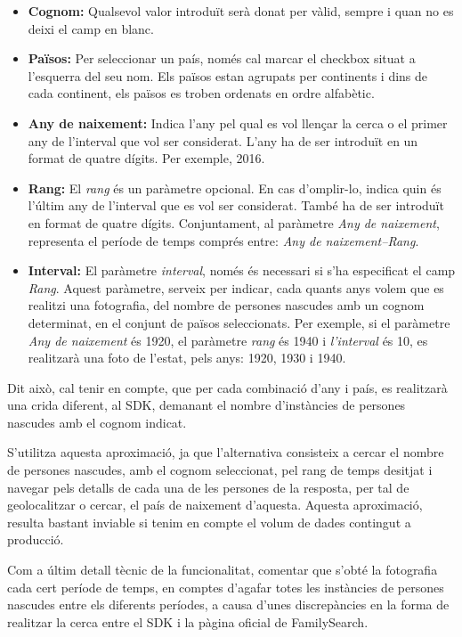     \begin{itemize}
        \item \textbf{Cognom:} Qualsevol valor introduït serà donat per vàlid, sempre i quan no es deixi el camp en blanc.
        \item \textbf{Països:} Per seleccionar un país, només cal marcar el checkbox situat a l’esquerra del seu nom. Els països estan agrupats per continents i dins de cada continent, els països es troben ordenats en ordre alfabètic.
        \item \textbf{Any de naixement:} Indica l'any pel qual es vol llençar la cerca o el primer any de l’interval que vol ser considerat. L'any ha de ser introduït en un format de quatre dígits. Per exemple, 2016.
        \item \textbf{Rang:} El \emph{rang} és un paràmetre opcional. En cas d’omplir-lo, indica quin és l'últim any de l’interval que es vol ser considerat. També ha de ser introduït en format de quatre dígits. Conjuntament, al paràmetre \emph{Any de naixement}, representa el període de temps comprés entre: \emph{Any de naixement--Rang}.
        \item \textbf{Interval:} El paràmetre \emph{interval}, només és necessari si s'ha especificat el camp \emph{Rang}. Aquest paràmetre, serveix per indicar, cada quants anys volem que es realitzi una fotografia, del nombre de persones nascudes amb un cognom determinat, en el conjunt de països seleccionats. Per exemple, si el paràmetre \emph{Any de naixement} és 1920, el paràmetre \emph{rang} és 1940 i \emph{l’interval} és 10, es realitzarà una foto de l'estat, pels anys: 1920, 1930 i 1940.
    \end{itemize}

    Dit això, cal tenir en compte, que per cada combinació d'any i país, es realitzarà una crida diferent, al SDK, demanant el nombre d'instàncies de persones nascudes amb el cognom indicat.

    S'utilitza aquesta aproximació, ja que l'alternativa consisteix a cercar el nombre de persones nascudes, amb el cognom seleccionat, pel rang de temps desitjat i navegar pels detalls de cada una de les persones de la resposta, per tal de geolocalitzar o cercar, el país de naixement d’aquesta. Aquesta aproximació, resulta bastant inviable si tenim en compte el volum de dades contingut a producció.

    Com a últim detall tècnic de la funcionalitat, comentar que s'obté la fotografia cada cert període de temps, en comptes d'agafar totes les instàncies de persones nascudes entre els diferents períodes, a causa d’unes discrepàncies en la forma de realitzar la cerca entre el SDK i la pàgina oficial de FamilySearch.

